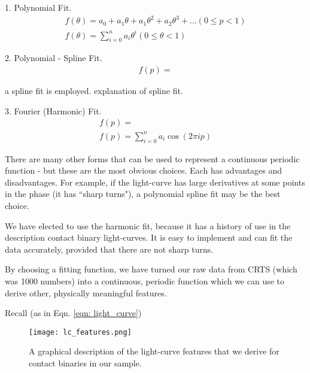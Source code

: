 \documentclass[12pt]{article} %
\numberwithin{equation}{section} %
\begin{document}
1. Polynomial Fit. \\

\begin{multline} \label{eqn: polynomial_fit}
f(\theta) = a_{0} + a_{1}\theta + a_{1}\theta^{2} + a_{2}\theta^{3} + ... (0 \leq p < 1) \\
f(\theta) = \sum_{i = 0}^{n} a_{i}\theta^{i}  (0 \leq \theta < 1)
\end{multline}

2. Polynomial - Spline Fit. \\

\begin{multline} \label{eqn: spline_fit} 
f(p) = 
\end{multline}

\citep{gettel2006catalog} a spline fit is employed. \citep{akerlof1994application} explanation of spline fit.

3. Fourier (Harmonic) Fit. \\

\begin{multline} \label{eqn: harmonic_fit} 
f(p) =  \\
f(p) = \sum_{i = 0}^{n} a_{i} \cos(2 \pi i p)
\end{multline}

There are many other forms that can be used to represent a continuous periodic function - but these are the most obvious choices. Each has advantages and disadvantages. For example, if the light-curve has large derivatives at some points in the phase (it has ``sharp turns"), a polynomial spline fit may be the best choice.

We have elected to use the harmonic fit, because it has a history of use in the description contact binary light-curves. It is easy to implement and can fit the data accurately, provided that there are not sharp turns.

By choosing a fitting function, we have turned our raw data from CRTS (which was 1000 numbers) into a continuous, periodic function which we can use to derive other, physically meaningful features.

Recall (as in Eqn. \ref{eqn: light_curve}) 

\begin{figure}[H]
\centering
\texttt{[image: lc\_features.png]}
\caption{A graphical description of the light-curve features that we derive for contact binaries in our sample.}
\label{fig: lc_features}
\end{figure}
\end{document}
